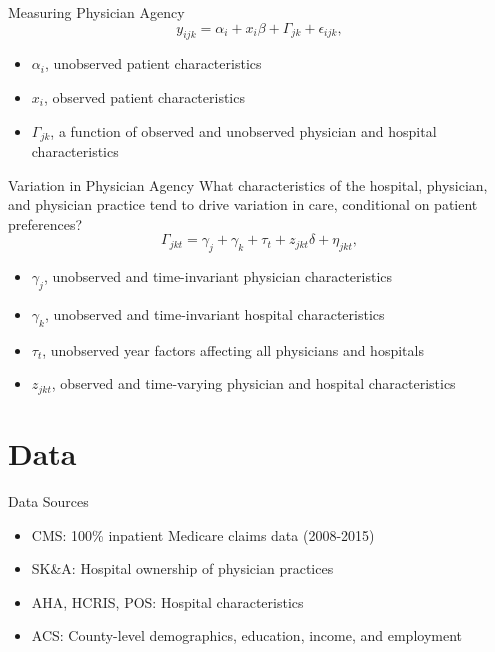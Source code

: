 \documentclass[t]{beamer}
\begin{document}
\begin{frame}{Measuring Physician Agency}
    \begin{equation*}
        y_{ijk} = \alpha_{i} + x_{i}\beta + \Gamma_{jk} + \epsilon_{ijk},
    \end{equation*}
    \begin{itemize}
        \item $\alpha_{i}$, unobserved patient characteristics
        \item $x_{i}$, observed patient characteristics
        \item $\Gamma_{jk}$, a function of observed and unobserved physician and hospital characteristics
    \end{itemize}
\end{frame}

\begin{frame}{Variation in Physician Agency}
    What characteristics of the hospital, physician, and physician practice tend to drive variation in care, conditional on patient preferences?
    \begin{equation*}
        \Gamma_{jkt} = \gamma_{j} + \gamma_{k} + \tau_{t} + z_{jkt}\delta + \eta_{jkt},
    \end{equation*}
    \begin{itemize}
        \item $\gamma_{j}$, unobserved and time-invariant physician characteristics
        \item $\gamma_{k}$, unobserved and time-invariant hospital characteristics
        \item $\tau_{t}$, unobserved year factors affecting all physicians and hospitals
        \item $z_{jkt}$, observed and time-varying physician and hospital characteristics
    \end{itemize}
\end{frame}


\section{Data}
\begin{frame}{Data Sources}
    \begin{itemize}
        \item<1-> CMS: 100\% inpatient Medicare claims data (2008-2015)
        \item<2-> SK\&A: Hospital ownership of physician practices
        \item<3-> AHA, HCRIS, POS: Hospital characteristics
        \item<4-> ACS: County-level demographics, education, income, and employment
    \end{itemize}
\end{frame}
\end{document}
